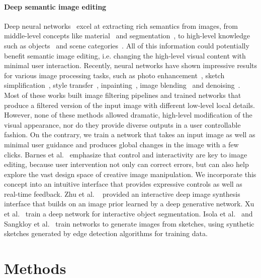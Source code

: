\documentclass[acmtog,authorversion]{acmart}
\begin{document}
\paragraph{Deep semantic image editing}
Deep neural networks~\cite{krizhevsky2012imagenet} excel at extracting rich semantics from images, from middle-level concepts like material~\cite{bell2015material,wang20164d} and segmentation~\cite{xie2015holistically}, to high-level knowledge such as objects~\cite{girshick2014rich} and scene categories~\cite{zhou2014learning}. All of this information could potentially benefit semantic image editing, i.e. changing the high-level visual content with minimal user interaction. Recently, neural networks have shown impressive results for various image processing tasks, such as photo enhancement~\cite{yan2016automatic}, sketch simplification~\cite{simo2016learning}, style transfer~\cite{gatys2016image,selim2016painting}, inpainting~\cite{pathakCVPR16context}, image blending~\cite{zhu2015learning} and denoising~\cite{gharbi2016deep}. Most of these works built image filtering pipelines and trained networks that produce a filtered version of the input image with different low-level local details. However, none of these methods allowed dramatic, high-level modification of the visual appearance, nor do they provide diverse outputs in a user controllable fashion. On the contrary, we train a network that takes an input image as well as minimal user guidance and produces global changes in the image with a few clicks. 
Barnes et al.~ emphasize that control and interactivity are key to image editing, because user intervention not only can correct errors, but can also help explore the vast design space of creative image manipulation. We incorporate this concept into an intuitive interface that provides expressive controls as well as real-time feedback. Zhu et al. ~ provided an interactive deep image synthesis interface that builds on an image prior learned by a deep generative network. Xu et al.~ train a deep network for interactive object segmentation. Isola et al.~ and Sangkloy et al.~ train networks to generate images from sketches, using synthetic sketches generated by edge detection algorithms for training data.

 \section{Methods}
\end{document}
